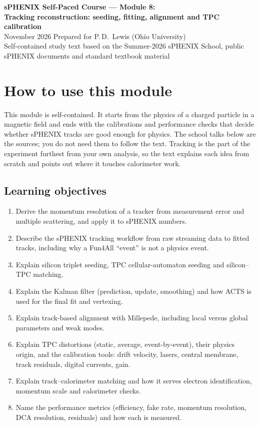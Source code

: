 \documentclass[11pt,letterpaper]{article}
\begin{document}
\begin{center}
{\LARGE\bfseries sPHENIX Self-Paced Course --- Module 8:}\\[4pt]
{\Large\bfseries Tracking reconstruction: seeding, fitting, alignment and TPC calibration}\\[8pt]
November 2026 \quad Prepared for P.\,D.\ Lewis (Ohio University)\\[2pt]
\small Self-contained study text based on the Summer-2026 sPHENIX School, public sPHENIX documents and standard textbook material
\end{center}

\tableofcontents
\newpage

\section*{How to use this module}
This module is self-contained. It starts from the physics of a charged particle in a magnetic field and ends with the
calibrations and performance checks that decide whether sPHENIX tracks are good enough for physics.
The school talks below are the sources; you do not need them to follow the text.
Tracking is the part of the experiment furthest from your own analysis, so the text explains each idea from scratch and points out where it touches calorimeter work.

\subsection*{Learning objectives}
\begin{enumerate}[label=O\arabic*.]
\item Derive the momentum resolution of a tracker from measurement error and multiple scattering, and apply it to sPHENIX numbers.
\item Describe the sPHENIX tracking workflow from raw streaming data to fitted tracks, including why a Fun4All ``event'' is not a physics event.
\item Explain silicon triplet seeding, TPC cellular-automaton seeding and silicon--TPC matching.
\item Explain the Kalman filter (prediction, update, smoothing) and how ACTS is used for the final fit and vertexing.
\item Explain track-based alignment with Millepede, including local versus global parameters and weak modes.
\item Explain TPC distortions (static, average, event-by-event), their physics origin, and the calibration tools: drift velocity, lasers, central membrane, track residuals, digital currents, gain.
\item Explain track--calorimeter matching and how it serves electron identification, momentum scale and calorimeter checks.
\item Name the performance metrics (efficiency, fake rate, momentum resolution, DCA resolution, residuals) and how each is measured.
\end{enumerate}
\end{document}
